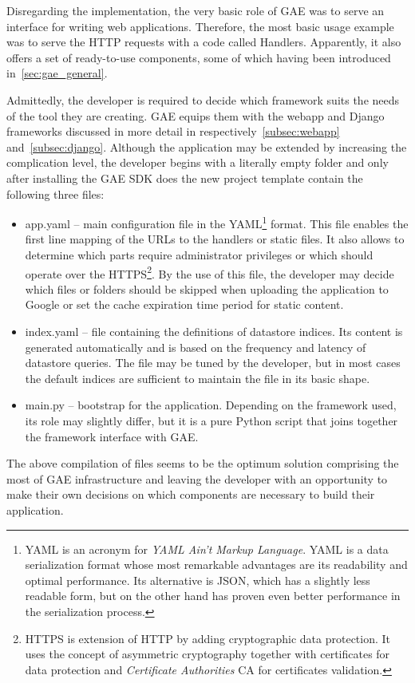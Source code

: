 Disregarding the implementation, the very basic role of GAE was to serve an interface for writing web applications. Therefore, the most basic usage example was to serve the HTTP requests with a code called Handlers. Apparently, it also offers a set of ready-to-use components, some of which having been introduced in~\ref{sec:gae_general}. 

Admittedly, the developer is required to decide which framework suits the needs of the tool they are creating. GAE equips them with the webapp and Django frameworks discussed in more detail in respectively~\ref{subsec:webapp} and~\ref{subsec:django}. Although the application may be extended by increasing the complication level, the developer begins with a literally empty folder and only after installing the GAE SDK does the new project template contain the following three files:
\begin{itemize}
\item{app.yaml} -- main configuration file in the YAML\footnote{YAML is an  acronym for \textit{YAML Ain't Markup Language}. YAML is a data serialization format whose most remarkable advantages are its readability and optimal performance. Its alternative is JSON, which has a slightly less readable form, but on the other hand has proven even better performance in the serialization process.} format. This file enables the first line mapping of the URLs to the handlers or static files. It also allows to determine which parts require administrator privileges or which should operate over the HTTPS\footnote{HTTPS is extension of HTTP by adding cryptographic data protection. It uses the concept of asymmetric cryptography together with certificates for data protection and \textit{Certificate Authorities} CA for certificates validation.}. By the use of this file, the developer may decide which files or folders should be skipped when uploading the application to Google or set the cache expiration time period for static content.   
\item{index.yaml} -- file containing the definitions of datastore indices. Its content is generated automatically and is based on the frequency and latency of datastore queries. The file may be tuned by the developer, but in most cases the default indices are sufficient to maintain the file in its basic shape.    
\item{main.py} -- bootstrap for the application. Depending on the framework used, its role may slightly differ, but it is a pure Python script that joins together the framework interface with GAE.  
\end{itemize}
The above compilation of files seems to be the optimum solution comprising the most of GAE infrastructure and leaving the developer with an opportunity to make their own decisions on which components are necessary to build their application.

